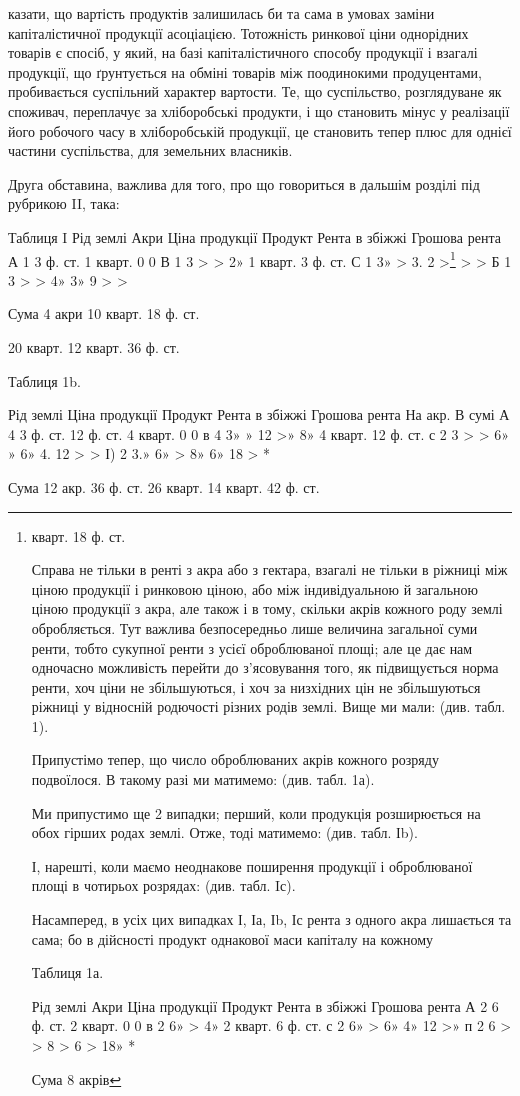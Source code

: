 казати, що вартість продуктів залишилась би та сама в умовах заміни капіталістичної
продукції асоціацією. Тотожність ринкової ціни однорідних товарів є
спосіб, у який, на базі капіталістичного способу продукції і взагалі продукції,
що ґрунтується на обміні товарів між поодинокими продуцентами, пробивається
суспільний характер вартости. Те, що суспільство, розглядуване як споживач,
переплачує за хліборобські продукти, і що становить мінус у реалізації його
робочого часу в хліборобській продукції, це становить тепер плюс для однієї
частини суспільства, для земельних власників.

Друга обставина, важлива для того, про що говориться в дальшім розділі
під рубрикою II, така:

Таблиця I
Рід  землі    Акри    Ціна  продукції    Продукт    Рента в збіжжі    Грошова  рента
А    1    3 ф. ст.    1 кварт.    0    0
В    1    3 > >    2» 1 кварт.    3 ф. ст.
С 1 3» > 3. 2 >\footnote{
кварт. 18 ф. ст.

Справа не тільки в ренті з акра або з гектара, взагалі не тільки в ріжниці
між ціною продукції і ринковою ціною, або між індивідуальною й загальною
ціною продукції з
акра, але також і в тому,
скільки акрів кожного
роду землі обробляється.
Тут важлива безпосередньо
лише величина загальної
суми ренти, тобто сукупної
ренти з усієї оброблюваної
площі; але це дає
нам одночасно можливість
перейти до з’ясовування
того, як підвищується норма
ренти, хоч ціни не
збільшуються, і хоч за
низхідних цін не збільшуються
ріжниці у відносній
родючості різних
родів землі. Вище ми мали:
(див. табл. 1).

Припустімо тепер,
що число оброблюваних
акрів кожного розряду подвоїлося.
В такому разі ми
матимемо: (див. табл. 1а).

Ми припустимо ще
2 випадки; перший, коли
продукція розширюється
на обох гірших родах землі.
Отже, тоді матимемо:
(див. табл. Іb).

І, нарешті, коли маємо
неоднакове поширення
продукції і оброблюваної
площі в чотирьох розрядах:
(див. табл. Iс).

Насамперед, в усіх
цих випадках І, Іа, Іb, Іс
рента з одного акра лишається
та сама; бо в
дійсності продукт однакової
маси капіталу на кожному

Таблиця 1а.

Рід  землі    Акри    Ціна  продукції    Продукт    Рента в збіжжі    Грошова  рента
А    2    6 ф. ст.    2 кварт.    0    0
в    2    6» >    4» 2 кварт.    6 ф. ст.
с    2    6» >    6» 4» 12 >»
п    2    6 > >    8 >    6 >    18» *

Сума 8 акрів
} > >
Б 1 3 > > 4» 3» 9 > >

Сума 4 акри 10 кварт. 18 ф. ст.

20 кварт. 12 кварт. 36 ф. ст.

Таблиця 1b.

Рід  землі    Ціна продукції        Продукт    Рента в збіжжі    Грошова  рента
        На  акр. В сумі
А    4    3 ф. ст.    12 ф. ст.    4 кварт.    0    0
в    4    3» »    12 >» 8» 4 кварт.    12 ф. ст.
с    2    3 > >    6» »    6» 4.    12 > >
І) 2 3.» 6» > 8» 6» 18 > *

Сума 12 акр. 36 ф. ст. 26 кварт. 14 кварт. 42 ф. ст.
